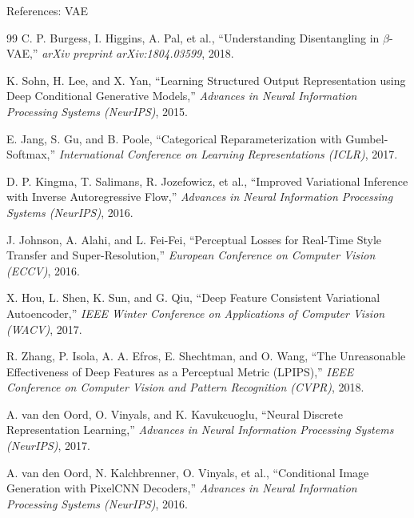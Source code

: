 \begin{frame}[allowframebreaks]{References: VAE}
\begin{thebibliography}{99}
        C. P. Burgess, I. Higgins, A. Pal, et al.,
        \newblock ``Understanding Disentangling in $\beta$-VAE,''
        \newblock \emph{arXiv preprint arXiv:1804.03599}, 2018.

        K. Sohn, H. Lee, and X. Yan,
        \newblock ``Learning Structured Output Representation using Deep Conditional Generative Models,''
        \newblock \emph{Advances in Neural Information Processing Systems (NeurIPS)}, 2015.

        E. Jang, S. Gu, and B. Poole,
        \newblock ``Categorical Reparameterization with Gumbel-Softmax,''
        \newblock \emph{International Conference on Learning Representations (ICLR)}, 2017.

        D. P. Kingma, T. Salimans, R. Jozefowicz, et al.,
        \newblock ``Improved Variational Inference with Inverse Autoregressive Flow,''
        \newblock \emph{Advances in Neural Information Processing Systems (NeurIPS)}, 2016.

        J. Johnson, A. Alahi, and L. Fei-Fei,
        \newblock ``Perceptual Losses for Real-Time Style Transfer and Super-Resolution,''
        \newblock \emph{European Conference on Computer Vision (ECCV)}, 2016.

        X. Hou, L. Shen, K. Sun, and G. Qiu,
        \newblock ``Deep Feature Consistent Variational Autoencoder,''
        \newblock \emph{IEEE Winter Conference on Applications of Computer Vision (WACV)}, 2017.

        R. Zhang, P. Isola, A. A. Efros, E. Shechtman, and O. Wang,
        \newblock ``The Unreasonable Effectiveness of Deep Features as a Perceptual Metric (LPIPS),''
        \newblock \emph{IEEE Conference on Computer Vision and Pattern Recognition (CVPR)}, 2018.

        A. van den Oord, O. Vinyals, and K. Kavukcuoglu,
        \newblock ``Neural Discrete Representation Learning,''
        \newblock \emph{Advances in Neural Information Processing Systems (NeurIPS)}, 2017.

        A. van den Oord, N. Kalchbrenner, O. Vinyals, et al.,
        \newblock ``Conditional Image Generation with PixelCNN Decoders,''
        \newblock \emph{Advances in Neural Information Processing Systems (NeurIPS)}, 2016.


\end{thebibliography}
\end{frame}
